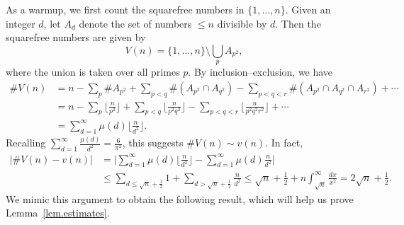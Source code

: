 \documentclass{article}
\theoremstyle{plain}
\theoremstyle{definition}
\theoremstyle{remark}
\begin{document}
As a warmup, we first count the squarefree numbers in $\{1,\ldots,n\}$.
Given an integer $d$, let $A_d$ denote the set of numbers $\leq n$ divisible by $d$.
Then the squarefree numbers are given by
\[
V(n)
=\{1,\ldots,n\}\setminus\bigcup_p A_{p^2},
\]
where the union is taken over all primes $p$.
By inclusion--exclusion, we have
\begin{align*}
\#V(n)
&=n-\sum_p\#A_{p^2}+\sum_{p<q}\#(A_{p^2}\cap A_{q^2})-\sum_{p<q<r}\#(A_{p^2}\cap A_{q^2}\cap A_{r^2})+\cdots\\
&=n-\sum_p\bigg\lfloor\frac{n}{p^2}\bigg\rfloor+\sum_{p<q}\bigg\lfloor\frac{n}{p^2q^2}\bigg\rfloor-\sum_{p<q<r}\bigg\lfloor\frac{n}{p^2q^2r^2}\bigg\rfloor+\cdots\\
&=\sum_{d=1}^\infty\mu(d)\bigg\lfloor\frac{n}{d^2}\bigg\rfloor.
\end{align*}
Recalling $\sum_{d=1}^\infty\frac{\mu(d)}{d^2}
=\frac{6}{\pi^2}$, this suggests $\#V(n)\sim v(n)$.
In fact,
\begin{align*}
\big|\#V(n)-v(n)\big|
&=\bigg|\sum_{d=1}^\infty\mu(d)\bigg\lfloor\frac{n}{d^2}\bigg\rfloor-\sum_{d=1}^\infty\mu(d)\frac{n}{d^2}\bigg|\\
&\leq\sum_{d\leq\sqrt{n}+\frac{1}{2}}1+\sum_{d>\sqrt{n}+\frac{1}{2}}\frac{n}{d^2}
\leq\sqrt{n}+\frac{1}{2}+n\int_{\sqrt{n}}^\infty\frac{dx}{x^2}
=2\sqrt{n}+\frac{1}{2}.
\end{align*}
We mimic this argument to obtain the following result, which will help us prove Lemma~\ref{lem.estimates}.
\end{document}
